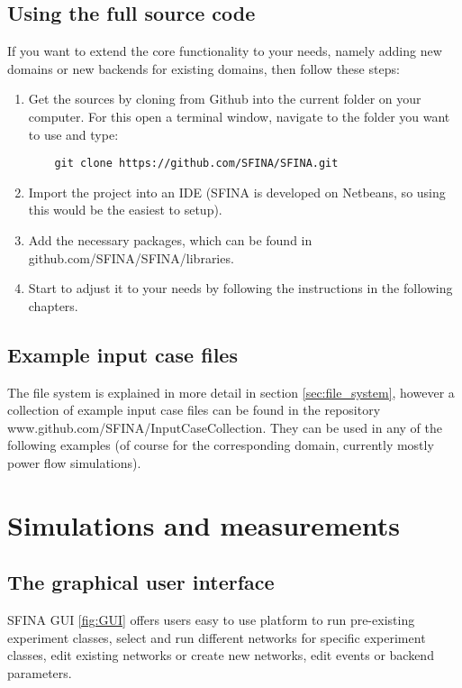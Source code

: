 \documentclass[11pt,fleqn]{book} %
\newcommand{\backend}[1][]{backend#1}
\newcommand{\domain}[1][]{domain#1}
\begin{document}
\subsection{Using the full source code}
If you want to extend the core functionality to your needs, namely adding new \domain{s} or new \backend{s} for existing \domain{s}, then follow these steps:
\begin{enumerate}
	\item Get the sources by cloning from Github into the current folder on your computer. For this open a terminal window, navigate to the folder you want to use and type: 
	\begin{lstlisting}
	git clone https://github.com/SFINA/SFINA.git
	\end{lstlisting}
	\item Import the project into an IDE (SFINA is developed on Netbeans, so using this would be the easiest to setup).
	\item Add the necessary packages, which can be found in github.com/SFINA/SFINA/libraries.
	\item Start to adjust it to your needs by following the instructions in the following chapters.
\end{enumerate}

\subsection{Example input case files}
The file system is explained in more detail in section \ref{sec:file_system}, however a collection of example input case files can be found in the repository www.github.com/SFINA/InputCaseCollection. They can be used in any of the following examples (of course for the corresponding domain, currently mostly power flow simulations).

\section{Simulations and measurements}
\subsection{The graphical user interface}\label{sec:GUI}
SFINA GUI \ref{fig:GUI} offers users easy to use platform to run pre-existing experiment classes, select and run different networks for specific experiment classes, edit existing networks or create new networks, edit events or backend parameters. 
\end{document}
